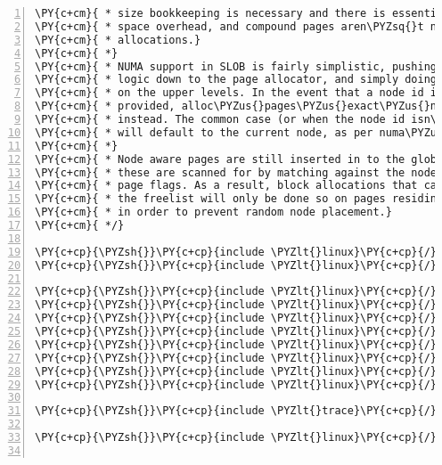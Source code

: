 \begin{Verbatim}[commandchars=\\\{\},numbers=left,firstnumber=1,stepnumber=1]
\PY{c+cm}{ * size bookkeeping is necessary and there is essentially no allocation}
\PY{c+cm}{ * space overhead, and compound pages aren\PYZsq{}t needed for multi\PYZhy{}page}
\PY{c+cm}{ * allocations.}
\PY{c+cm}{ *}
\PY{c+cm}{ * NUMA support in SLOB is fairly simplistic, pushing most of the real}
\PY{c+cm}{ * logic down to the page allocator, and simply doing the node accounting}
\PY{c+cm}{ * on the upper levels. In the event that a node id is explicitly}
\PY{c+cm}{ * provided, alloc\PYZus{}pages\PYZus{}exact\PYZus{}node() with the specified node id is used}
\PY{c+cm}{ * instead. The common case (or when the node id isn\PYZsq{}t explicitly provided)}
\PY{c+cm}{ * will default to the current node, as per numa\PYZus{}node\PYZus{}id().}
\PY{c+cm}{ *}
\PY{c+cm}{ * Node aware pages are still inserted in to the global freelist, and}
\PY{c+cm}{ * these are scanned for by matching against the node id encoded in the}
\PY{c+cm}{ * page flags. As a result, block allocations that can be satisfied from}
\PY{c+cm}{ * the freelist will only be done so on pages residing on the same node,}
\PY{c+cm}{ * in order to prevent random node placement.}
\PY{c+cm}{ */}

\PY{c+cp}{\PYZsh{}}\PY{c+cp}{include \PYZlt{}linux}\PY{c+cp}{/}\PY{c+cp}{kernel.h\PYZgt{}}
\PY{c+cp}{\PYZsh{}}\PY{c+cp}{include \PYZlt{}linux}\PY{c+cp}{/}\PY{c+cp}{slab.h\PYZgt{}}

\PY{c+cp}{\PYZsh{}}\PY{c+cp}{include \PYZlt{}linux}\PY{c+cp}{/}\PY{c+cp}{mm.h\PYZgt{}}
\PY{c+cp}{\PYZsh{}}\PY{c+cp}{include \PYZlt{}linux}\PY{c+cp}{/}\PY{c+cp}{swap.h\PYZgt{} }\PY{c+cm}{/* struct reclaim\PYZus{}state */}
\PY{c+cp}{\PYZsh{}}\PY{c+cp}{include \PYZlt{}linux}\PY{c+cp}{/}\PY{c+cp}{cache.h\PYZgt{}}
\PY{c+cp}{\PYZsh{}}\PY{c+cp}{include \PYZlt{}linux}\PY{c+cp}{/}\PY{c+cp}{init.h\PYZgt{}}
\PY{c+cp}{\PYZsh{}}\PY{c+cp}{include \PYZlt{}linux}\PY{c+cp}{/}\PY{c+cp}{export.h\PYZgt{}}
\PY{c+cp}{\PYZsh{}}\PY{c+cp}{include \PYZlt{}linux}\PY{c+cp}{/}\PY{c+cp}{rcupdate.h\PYZgt{}}
\PY{c+cp}{\PYZsh{}}\PY{c+cp}{include \PYZlt{}linux}\PY{c+cp}{/}\PY{c+cp}{list.h\PYZgt{}}
\PY{c+cp}{\PYZsh{}}\PY{c+cp}{include \PYZlt{}linux}\PY{c+cp}{/}\PY{c+cp}{kmemleak.h\PYZgt{}}

\PY{c+cp}{\PYZsh{}}\PY{c+cp}{include \PYZlt{}trace}\PY{c+cp}{/}\PY{c+cp}{events}\PY{c+cp}{/}\PY{c+cp}{kmem.h\PYZgt{}}

\PY{c+cp}{\PYZsh{}}\PY{c+cp}{include \PYZlt{}linux}\PY{c+cp}{/}\PY{c+cp}{atomic.h\PYZgt{}}


\end{Verbatim}
